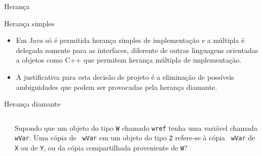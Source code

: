 \begin{frame}{Herança}
  
  \begin{block}{Herança simples}
    \small
    \begin{itemize}
    \item Em Java só é permitida herança simples de implementação e a
      múltipla é delegada somente para as interfaces, diferente de
      outras linguagens orientadas a objetos como C++ que permitem
      herança múltipla de implementação.
      \item A justificativa para esta decisão de projeto é a
        eliminação de possíveis ambiguidades que podem ser provocadas
        pela \alert{herança diamante}.
    \end{itemize}
    \end{block}


    \begin{block}{Herança diamante}
      \footnotesize
      \begin{columns}
        \begin{column}{.4\textwidth}
        \end{column}

        \begin{column}{.65\textwidth}
          Supondo que um objeto do tipo {\tt W} chamado {\tt wref}
          tenha uma variável chamada {\tt wVar}. Uma cópia de {\tt
            wVar} em um objeto do tipo {\tt Z} refere-se à cópia {\tt
            wVar} de {\tt X} ou de {\tt Y}, ou da cópia compartilhada
          proveniente de {\tt W}?
        \end{column}

      \end{columns}

  \end{block}

\end{frame}



